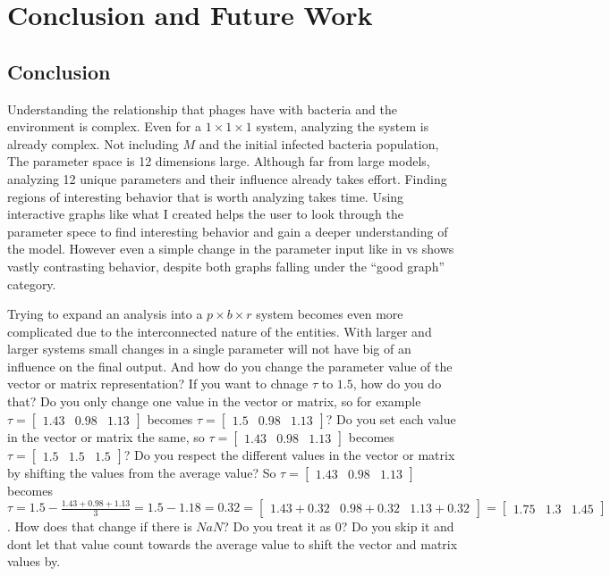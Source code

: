\chapter{Conclusion and Future Work}
\label{CAFW}

\section{Conclusion}
\label{Conclusion}
Understanding the relationship that phages have with bacteria and the environment is complex. 
Even for a $1\times1\times1$ system, analyzing the system is already complex. 
Not including $M$ and the initial infected bacteria population, The parameter space is 12 dimensions large. 
Although far from large models, analyzing 12 unique parameters and their influence already takes effort. 
Finding regions of interesting behavior that is worth analyzing takes time. 
Using interactive graphs like what I created helps the user to look through the parameter spece to find interesting behavior and gain a deeper understanding of the model. 
However even a simple change in the parameter input like in  vs  shows vastly contrasting behavior, despite both graphs falling under the “good graph” category. 

Trying to expand an analysis into a $p\times b\times r$ system becomes even more complicated due to the interconnected nature of the entities. 
With larger and larger systems small changes in a single parameter will not have big of an influence on the final output. 
And how do you change the parameter value of the vector or matrix representation? 
If you want to chnage $\tau$ to $1.5$, how do you do that? 
Do you only change one value in the vector or matrix, so for example $\tau = \begin{bmatrix} 1.43 & 0.98 & 1.13\end{bmatrix}$ becomes $\tau = \begin{bmatrix} 1.5 & 0.98 & 1.13\end{bmatrix}$? 
Do you set each value in the vector or matrix the same, so $\tau = \begin{bmatrix} 1.43 & 0.98 & 1.13\end{bmatrix}$ becomes $\tau = \begin{bmatrix} 1.5 & 1.5 & 1.5\end{bmatrix}$? 
Do you respect the different values in the vector or matrix by shifting the values from the average value? 
So $\tau = \begin{bmatrix} 1.43 & 0.98 & 1.13\end{bmatrix}$ becomes $\tau = 1.5 - \frac{1.43 + 0.98 + 1.13}{3} = 1.5-1.18 = 0.32 = \begin{bmatrix} 1.43+0.32 & 0.98+0.32 & 1.13+0.32\end{bmatrix} = \begin{bmatrix} 1.75 & 1.3 & 1.45\end{bmatrix}$. 
How does that change if there is $NaN$? 
Do you treat it as 0? 
Do you skip it and dont let that value count towards the average value to shift the vector and matrix values by. 


